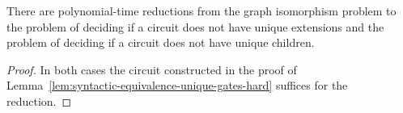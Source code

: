 \documentclass[../paper.tex]{subfiles}
\begin{document}
\begin{lem}
  There are polynomial-time reductions from the graph isomorphism problem to the
  problem of deciding if a circuit does not have unique extensions and the
  problem of deciding if a circuit does not have unique children.
  \label{lem:unique-extensions-hard}
\end{lem}
\begin{proof}
  In both cases the circuit constructed in the proof of
  Lemma~\ref{lem:syntactic-equivalence-unique-gates-hard} suffices for the
  reduction.
\end{proof}



\end{document}
